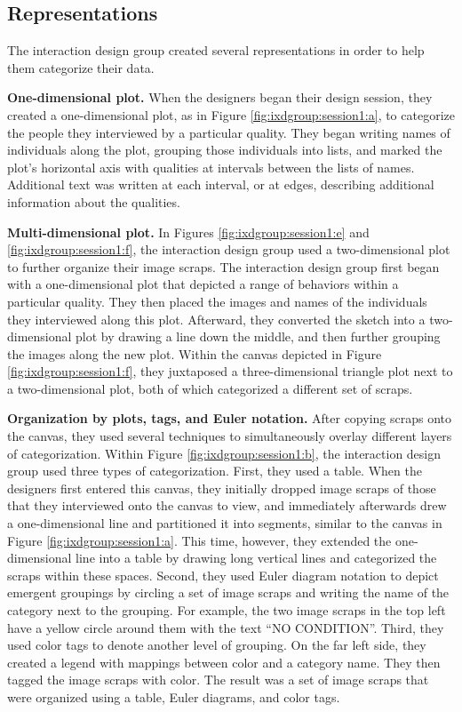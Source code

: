 \documentclass[12pt,fleqn]{ucithesis}
\begin{document}
\subsection{Representations}

The interaction design group created several representations in order to help them categorize their data. 

\textbf{One-dimensional plot.} When the designers began their design session, they created a one-dimensional plot, as in Figure \ref{fig:ixdgroup:session1:a}, to categorize the people they interviewed by a particular quality. They began writing names of individuals along the plot, grouping those individuals into lists, and marked the plot's horizontal axis with qualities at intervals between the lists of names. Additional text was written at each interval, or at edges, describing additional information about the qualities.

\textbf{Multi-dimensional plot.} In Figures \ref{fig:ixdgroup:session1:e} and \ref{fig:ixdgroup:session1:f}, the interaction design group used a two-dimensional plot to further organize their image scraps. The interaction design group first began with a one-dimensional plot that depicted a range of behaviors within a particular quality. They then placed the images and names of the individuals they interviewed along this plot. Afterward, they converted the sketch into a two-dimensional plot by drawing a line down the middle, and then further grouping the images along the new plot. Within the canvas depicted in Figure \ref{fig:ixdgroup:session1:f}, they juxtaposed a three-dimensional triangle plot next to a two-dimensional plot, both of which categorized a different set of scraps.

\textbf{Organization by plots, tags, and Euler notation.} After copying scraps onto the canvas, they used several techniques to simultaneously overlay  different layers of categorization. Within Figure \ref{fig:ixdgroup:session1:b}, the interaction design group used three types of categorization. First, they used a table. When the designers first entered this canvas, they initially dropped image scraps of those that they interviewed onto the canvas to view, and immediately afterwards drew a one-dimensional line and partitioned it into segments, similar to the canvas in Figure \ref{fig:ixdgroup:session1:a}. This time, however, they extended the one-dimensional line into a table by drawing long vertical lines and categorized the scraps within these spaces. Second, they used Euler diagram notation to depict emergent groupings by circling a set of image scraps and writing the name of the category next to the grouping. For example, the two image scraps in the top left have a yellow circle around them with the text ``NO CONDITION''. Third, they used color tags to denote another level of grouping. On the far left side, they created a legend with mappings between color and a category name. They then tagged the image scraps with color. The result was a set of image scraps that were organized using a table, Euler diagrams, and color tags.
\end{document}
